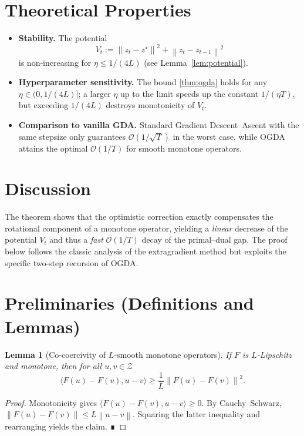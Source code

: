 \documentclass{article}
\newtheorem{lemma}{Lemma}
\newcommand{\norm}[1]{\left\lVert#1\right\rVert}
\newcommand{\inner}[2]{\langle #1,#2\rangle}
\begin{document}
\section*{Theoretical Properties}
\begin{itemize}[leftmargin=*,labelsep=5mm]
\item \textbf{Stability.} The potential
\[
V_t:=\norm{z_t-z^\star}^2+\norm{z_t-z_{t-1}}^2
\]
is non‑increasing for $\eta\le1/(4L)$ (see Lemma~\ref{lem:potential}).
\item \textbf{Hyperparameter sensitivity.} The bound \eqref{thm:ogda} holds for any
$\eta\in(0,1/(4L)]$; a larger $\eta$ up to the limit speeds up the constant
$1/(\eta T)$, but exceeding $1/(4L)$ destroys monotonicity of $V_t$.
\item \textbf{Comparison to vanilla GDA.} Standard Gradient Descent–Ascent with the same stepsize only guarantees $\mathcal O(1/\sqrt{T})$ in the worst case, while OGDA attains the optimal $\mathcal O(1/T)$ for smooth monotone operators.
\end{itemize}

\section*{Discussion}
The theorem shows that the optimistic correction exactly compensates the
rotational component of a monotone operator, yielding a \emph{linear} decrease of the
potential $V_t$ and thus a \emph{fast} $\mathcal O(1/T)$ decay of the primal–dual gap.
The proof below follows the classic analysis of the extragradient method but
exploits the specific two‑step recursion of OGDA.

\newpage

\section*{Preliminaries (Definitions and Lemmas)}
\begin{lemma}[Co‑coercivity of $L$‑smooth monotone operators]\label{lem:coercive}
If $F$ is $L$‑Lipschitz and monotone, then for all $u,v\in\mathcal Z$
\[
\inner{F(u)-F(v)}{u-v}\ge\frac{1}{L}\norm{F(u)-F(v)}^{2}.
\]
\end{lemma}
\begin{proof}
Monotonicity gives $\inner{F(u)-F(v)}{u-v}\ge0$. By Cauchy–Schwarz,
$\norm{F(u)-F(v)}\le L\norm{u-v}$. Squaring the latter inequality and rearranging
yields the claim. ∎
\end{proof}
\end{document}
